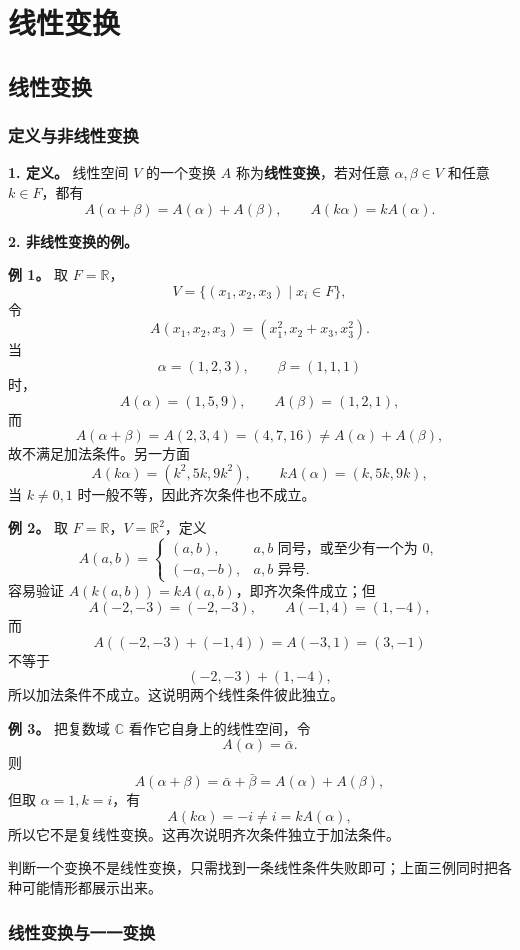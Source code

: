 \chapter{线性变换}

\section{线性变换}

\subsection{定义与非线性变换}

\textbf{1. 定义。} 线性空间 $V$ 的一个变换 $A$ 称为\textbf{线性变换}，若对任意 $\alpha,\beta\in V$ 和任意 $k\in F$，都有
\[
A(\alpha+\beta)=A(\alpha)+A(\beta),
\qquad
A(k\alpha)=kA(\alpha).
\]

\textbf{2. 非线性变换的例。}

\textbf{例 1。} 取 $F=\mathbb R$，
\[
V=\{(x_1,x_2,x_3)\mid x_i\in F\},
\]
令
\[
A(x_1,x_2,x_3)=(x_1^2,x_2+x_3,x_3^2).
\]
当
\[
\alpha=(1,2,3),\qquad \beta=(1,1,1)
\]
时，
\[
A(\alpha)=(1,5,9),\qquad A(\beta)=(1,2,1),
\]
而
\[
A(\alpha+\beta)=A(2,3,4)=(4,7,16)\ne A(\alpha)+A(\beta),
\]
故不满足加法条件。另一方面
\[
A(k\alpha)=(k^2,5k,9k^2),
\qquad
kA(\alpha)=(k,5k,9k),
\]
当 $k\ne0,1$ 时一般不等，因此齐次条件也不成立。

\textbf{例 2。} 取 $F=\mathbb R$，$V=\mathbb R^2$，定义
\[
A(a,b)=\begin{cases}
(a,b),&a,b\text{ 同号，或至少有一个为 }0,\\
(-a,-b),&a,b\text{ 异号}.
\end{cases}
\]
容易验证 $A(k(a,b))=kA(a,b)$，即齐次条件成立；但
\[
A(-2,-3)=(-2,-3),\qquad A(-1,4)=(1,-4),
\]
而
\[
A((-2,-3)+(-1,4))=A(-3,1)=(3,-1)
\]
不等于
\[
(-2,-3)+(1,-4),
\]
所以加法条件不成立。这说明两个线性条件彼此独立。

\textbf{例 3。} 把复数域 $\mathbb C$ 看作它自身上的线性空间，令
\[
A(\alpha)=\bar\alpha.
\]
则
\[
A(\alpha+\beta)=\bar\alpha+\bar\beta=A(\alpha)+A(\beta),
\]
但取 $\alpha=1,k=i$，有
\[
A(k\alpha)=-i\ne i=kA(\alpha),
\]
所以它不是复线性变换。这再次说明齐次条件独立于加法条件。

判断一个变换不是线性变换，只需找到一条线性条件失败即可；上面三例同时把各种可能情形都展示出来。

\subsection{线性变换与一一变换}

